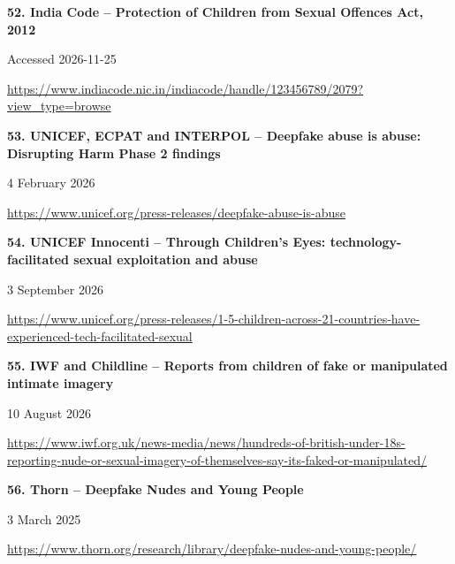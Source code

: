 \documentclass[11pt,a4paper]{article}
\begin{document}
\noindent\begin{minipage}{\linewidth}\textbf{52. India Code -- Protection of Children from Sexual Offences Act, 2012}\par{\small Accessed 2026-11-25\par\url{https://www.indiacode.nic.in/indiacode/handle/123456789/2079?view_type=browse}}\par
\end{minipage}\par\vspace{2mm}
\noindent\begin{minipage}{\linewidth}\textbf{53. UNICEF, ECPAT and INTERPOL -- Deepfake abuse is abuse: Disrupting Harm Phase 2 findings}\par{\small 4 February 2026\par\url{https://www.unicef.org/press-releases/deepfake-abuse-is-abuse}}\par
\end{minipage}\par\vspace{2mm}
\noindent\begin{minipage}{\linewidth}\textbf{54. UNICEF Innocenti -- Through Children's Eyes: technology-facilitated sexual exploitation and abuse}\par{\small 3 September 2026\par\url{https://www.unicef.org/press-releases/1-5-children-across-21-countries-have-experienced-tech-facilitated-sexual}}\par
\end{minipage}\par\vspace{2mm}
\noindent\begin{minipage}{\linewidth}\textbf{55. IWF and Childline -- Reports from children of fake or manipulated intimate imagery}\par{\small 10 August 2026\par\url{https://www.iwf.org.uk/news-media/news/hundreds-of-british-under-18s-reporting-nude-or-sexual-imagery-of-themselves-say-its-faked-or-manipulated/}}\par
\end{minipage}\par\vspace{2mm}
\noindent\begin{minipage}{\linewidth}\textbf{56. Thorn -- Deepfake Nudes and Young People}\par{\small 3 March 2025\par\url{https://www.thorn.org/research/library/deepfake-nudes-and-young-people/}}\par
\end{minipage}\par\vspace{2mm}
\end{document}
